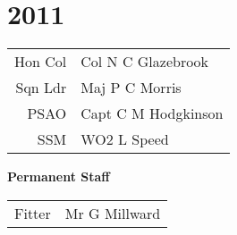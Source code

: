 \chapter*{2011}

\vspace*{20mm}

\begin{center}
  \begin{tabular}{rl}
    Hon Col & Col N C Glazebrook \\
    Sqn Ldr & Maj P C Morris \\
    PSAO & Capt C M Hodgkinson \\
    SSM & WO2 L Speed \\
  \end{tabular}
\end{center}

\begin{center}
  \Large
  \textbf{Permanent Staff}
\end{center}

\begin{center}
  \begin{tabular}{rl}
    Fitter & Mr G Millward \\
  \end{tabular}
\end{center}
